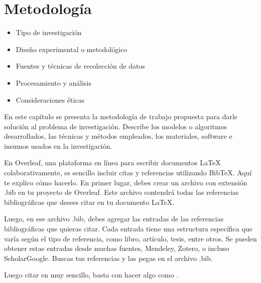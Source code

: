 \chapter{Metodología} \label{sec:Metodos}

\begin{itemize}
    \item Tipo de investigación
    \item Diseño experimental o metodológico
    \item Fuentes y técnicas de recolección de datos
    \item Procesamiento y análisis
    \item Consideraciones éticas

\end{itemize}


En este capítulo se presenta la metodología de trabajo propuesta para darle solución al problema de investigación. Describe los modelos o algoritmos desarrollados, las técnicas y  métodos empleados, los materiales, software e insumos usados en la investigación.

En Overleaf, una plataforma en línea para escribir documentos LaTeX colaborativamente, es sencillo incluir citas y referencias utilizando BibTeX. Aquí te explico cómo hacerlo. En primer lugar, debes crear un archivo con extensión .bib en tu proyecto de Overleaf. Este archivo contendrá todas las referencias bibliográficas que desees citar en tu documento LaTeX. 

Luego, en ese archivo .bib, debes agregar las entradas de las referencias bibliográficas que quieras citar. Cada entrada tiene una estructura específica que varía según el tipo de referencia, como libro, artículo, tesis, entre otros. Se pueden obtener estas entradas desde muchas fuentes, Mendeley, Zotero, o incluso ScholarGoogle. Buscas tus referencias y las pegas en el archivo .bib. 

Luego citar en muy sencillo, basta con hacer algo como \cite{liakos2018machine}.